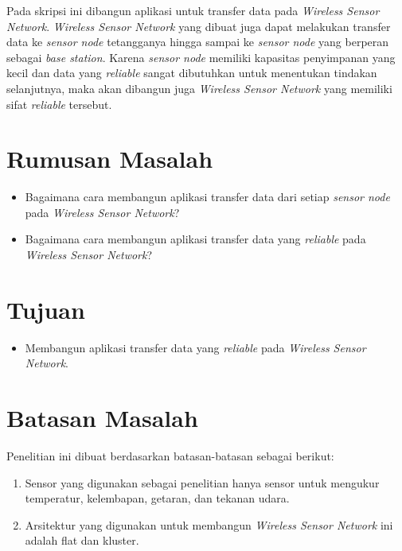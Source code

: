 Pada skripsi ini dibangun aplikasi untuk transfer data pada \textit{Wireless Sensor Network}. \textit{Wireless Sensor Network} yang dibuat juga dapat melakukan transfer data ke \textit{sensor node} tetangganya hingga sampai ke \textit{sensor node} yang berperan sebagai \textit{base station}. Karena \textit{sensor node} memiliki kapasitas penyimpanan yang kecil dan data yang \textit{reliable} sangat dibutuhkan untuk menentukan tindakan selanjutnya, maka akan dibangun juga \textit{Wireless Sensor Network} yang memiliki sifat \textit{reliable} tersebut.


\section{Rumusan Masalah}
\label{sec:rumusan}
\begin{itemize}
	\item Bagaimana cara membangun aplikasi transfer data dari setiap \textit{sensor node} pada \textit{Wireless Sensor Network}?
	\item Bagaimana cara membangun aplikasi transfer data yang \textit{reliable} pada \textit{Wireless Sensor Network}?
\end{itemize}

\section{Tujuan}
\label{sec:tujuan}
\begin{itemize}
 \item Membangun aplikasi transfer data yang \textit{reliable} pada \textit{Wireless Sensor Network}.
\end{itemize}

\section{Batasan Masalah}
\label{sec:batasan}
Penelitian ini dibuat berdasarkan batasan-batasan sebagai berikut:
\begin{enumerate}
	\item Sensor yang digunakan sebagai penelitian hanya sensor untuk mengukur temperatur, kelembapan, getaran, dan tekanan udara.
	\item Arsitektur yang digunakan untuk membangun \textit{Wireless Sensor Network} ini adalah flat dan kluster.
\end{enumerate}

